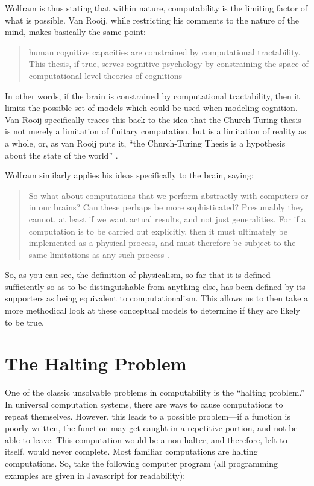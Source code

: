 Wolfram is thus stating that within nature, computability is the limiting factor of what is possible.  Van Rooij, while restricting his comments to the nature of the mind, makes basically the same point:

\begin{quote}
human cognitive capacities are constrained by computational tractability.  This thesis, if true, serves cognitive psychology by constraining the space of computational-level theories of cognitions \citep{vanrooij2008}
\end{quote}

In other words, if the brain is constrained by computational tractability, then it limits the possible set of models which could be used when modeling cognition.  Van Rooij specifically traces this back to the idea that the Church-Turing thesis is not merely a limitation of finitary computation, but is a limitation of reality as a whole, or, as van Rooij puts it, ``the Church-Turing Thesis is a hypothesis about the state of the world'' \citep{vanrooij2008}.

Wolfram similarly applies his ideas specifically to the brain, saying:

\begin{quote}
So what about computations that we perform abstractly with computers or in our brains?  Can these perhaps be more sophisticated?  Presumably they cannot, at least if we want  actual results, and not just generalities.  For if a computation is to be carried out explicitly, then it must ultimately be implemented as a physical process, and must therefore be subject to the same limitations as any such process \citep[][pg. 721]{wolfram2002}.
\end{quote}

So, as you can see, the definition of physicalism, so far that it is defined sufficiently so as to be distinguishable from anything else, has been defined by its supporters as being equivalent to computationalism.  This allows us to then take a more methodical look at these conceptual models to determine if they are likely to be true.

\section{The Halting Problem}

One of the classic unsolvable problems in computability is the ``halting problem.''  In universal computation systems, there are ways to cause computations to repeat themselves.  However, this leads to a possible problem---if a function is poorly written, the function may get caught in a repetitive portion, and not be able to leave.  This computation would be a non-halter, and therefore, left to itself, would never complete.  Most familiar computations are halting computations.  So, take the following computer program (all programming examples are given in Javascript for readability):

